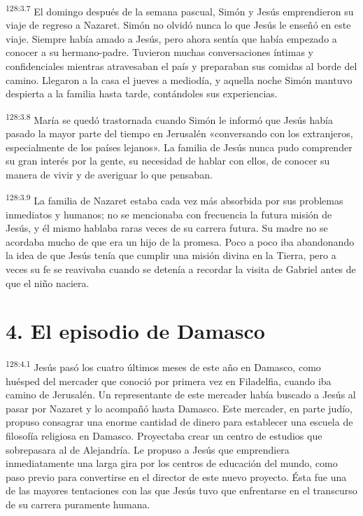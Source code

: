 \par
\textsuperscript{128:3.7} El domingo después de la semana pascual, Simón y Jesús emprendieron su viaje de regreso a Nazaret. Simón no olvidó nunca lo que Jesús le enseñó en este viaje. Siempre había amado a Jesús, pero ahora sentía que había empezado a conocer a su hermano-padre. Tuvieron muchas conversaciones íntimas y confidenciales mientras atravesaban el país y preparaban sus comidas al borde del camino. Llegaron a la casa el jueves a mediodía, y aquella noche Simón mantuvo despierta a la familia hasta tarde, contándoles sus experiencias.

\par
\textsuperscript{128:3.8} María se quedó trastornada cuando Simón le informó que Jesús había pasado la mayor parte del tiempo en Jerusalén «conversando con los extranjeros, especialmente de los países lejanos». La familia de Jesús nunca pudo comprender su gran interés por la gente, su necesidad de hablar con ellos, de conocer su manera de vivir y de averiguar lo que pensaban.

\par
\textsuperscript{128:3.9} La familia de Nazaret estaba cada vez más absorbida por sus problemas inmediatos y humanos; no se mencionaba con frecuencia la futura misión de Jesús, y él mismo hablaba raras veces de su carrera futura. Su madre no se acordaba mucho de que era un hijo de la promesa. Poco a poco iba abandonando la idea de que Jesús tenía que cumplir una misión divina en la Tierra, pero a veces su fe se reavivaba cuando se detenía a recordar la visita de Gabriel antes de que el niño naciera.

\section*{4. El episodio de Damasco}
\par
\textsuperscript{128:4.1} Jesús pasó los cuatro últimos meses de este año en Damasco, como huésped del mercader que conoció por primera vez en Filadelfia, cuando iba camino de Jerusalén. Un representante de este mercader había buscado a Jesús al pasar por Nazaret y lo acompañó hasta Damasco. Este mercader, en parte judío, propuso consagrar una enorme cantidad de dinero para establecer una escuela de filosofía religiosa en Damasco. Proyectaba crear un centro de estudios que sobrepasara al de Alejandría. Le propuso a Jesús que emprendiera inmediatamente una larga gira por los centros de educación del mundo, como paso previo para convertirse en el director de este nuevo proyecto. Ésta fue una de las mayores tentaciones con las que Jesús tuvo que enfrentarse en el transcurso de su carrera puramente humana.

